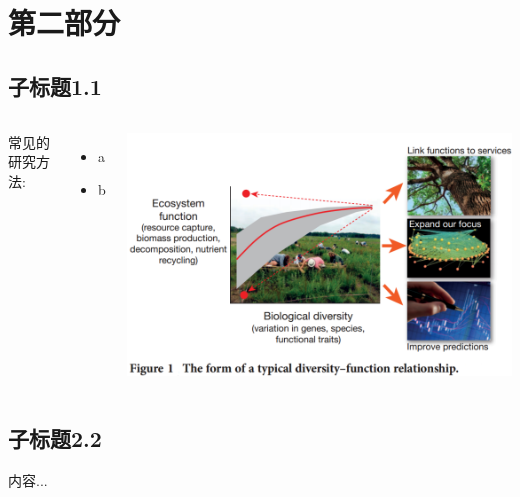 \section{第二部分}
\subsection{子标题1.1}
\begin{frame}{\insertsubsection}
	\begin{columns}
		常见的研究方法:
		\begin{itemize}
			\item<1-> a
			\item<2-> b		
		\end{itemize}
		\begin{center}
			\includegraphics[width = \textwidth]{./pic/2.1.1.png}
		\end{center}
	\end{columns}
\end{frame}


\subsection{子标题2.2}
\begin{frame}{\insertsubsection}
	内容...
\end{frame}


